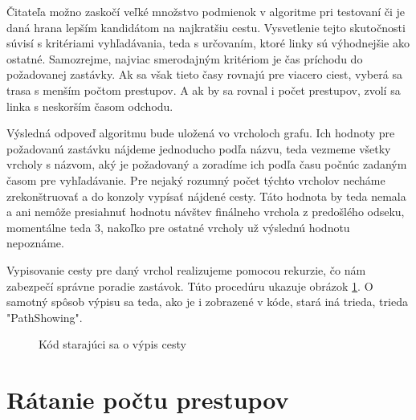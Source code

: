 Čitateľa možno zaskočí veľké množstvo podmienok v algoritme pri testovaní či je daná hrana lepším kandidátom na najkratšiu cestu. Vysvetlenie tejto skutočnosti súvisí s kritériami vyhľadávania, teda s určovaním, ktoré linky sú výhodnejšie ako ostatné. Samozrejme, najviac smerodajným kritériom je čas príchodu do požadovanej zastávky. Ak sa však tieto časy rovnajú pre viacero ciest, vyberá sa trasa s menším počtom prestupov. A ak by sa rovnal i počet prestupov, zvolí sa linka s neskorším časom odchodu.\newline

Výsledná odpoveď algoritmu bude uložená vo vrcholoch grafu. Ich hodnoty pre požadovanú zastávku nájdeme jednoducho podľa názvu, teda vezmeme všetky vrcholy s názvom, aký je požadovaný a zoradíme ich podľa času počnúc zadaným časom pre vyhľadávanie. Pre nejaký rozumný počet týchto vrcholov necháme zrekonštruovať a do konzoly vypísať nájdené cesty. Táto hodnota by teda nemala a ani nemôže presiahnuť hodnotu návštev finálneho vrchola z predošlého odseku, momentálne teda $3$, nakoľko pre ostatné vrcholy už výslednú hodnotu nepoznáme.\newline

Vypisovanie cesty pre daný vrchol realizujeme pomocou rekurzie, čo nám zabezpečí správne poradie zastávok. Túto procedúru ukazuje obrázok \ref{PathShowing}. O samotný spôsob výpisu sa teda, ako je i zobrazené v kóde, stará iná trieda, trieda "PathShowing".\newline

\begin{figure}[H]
  \caption{Kód starajúci sa o výpis cesty}
  \label{PathShowing}
\end{figure}


\section{Rátanie počtu prestupov}


